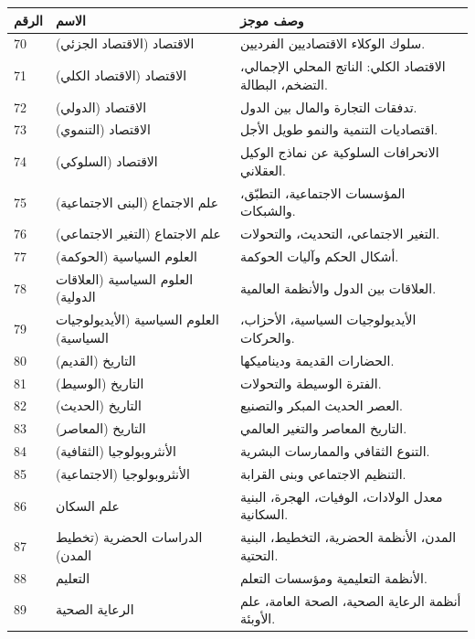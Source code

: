 \documentclass[13pt,a4paper]{article}
\begin{document}
	\begin{longtable}{|p{0.9cm}|p{6.0cm}|p{8.6cm}|}
		\hline
		\textbf{الرقم} & \textbf{الاسم} & \textbf{وصف موجز} \\
		\hline
		\endhead
		70 & الاقتصاد (الاقتصاد الجزئي) & سلوك الوكلاء الاقتصاديين الفرديين. \\
		\hline
		71 & الاقتصاد (الاقتصاد الكلي) & الاقتصاد الكلي: الناتج المحلي الإجمالي، التضخم، البطالة. \\
		\hline
		72 & الاقتصاد (الدولي) & تدفقات التجارة والمال بين الدول. \\
		\hline
		73 & الاقتصاد (التنموي) & اقتصاديات التنمية والنمو طويل الأجل. \\
		\hline
		74 & الاقتصاد (السلوكي) & الانحرافات السلوكية عن نماذج الوكيل العقلاني. \\
		\hline
		75 & علم الاجتماع (البنى الاجتماعية) & المؤسسات الاجتماعية، التطبّق، والشبكات. \\
		\hline
		76 & علم الاجتماع (التغير الاجتماعي) & التغير الاجتماعي، التحديث، والتحولات. \\
		\hline
		77 & العلوم السياسية (الحوكمة) & أشكال الحكم وآليات الحوكمة. \\
		\hline
		78 & العلوم السياسية (العلاقات الدولية) & العلاقات بين الدول والأنظمة العالمية. \\
		\hline
		79 & العلوم السياسية (الأيديولوجيات السياسية) & الأيديولوجيات السياسية، الأحزاب، والحركات. \\
		\hline
		80 & التاريخ (القديم) & الحضارات القديمة وديناميكها. \\
		\hline
		81 & التاريخ (الوسيط) & الفترة الوسيطة والتحولات. \\
		\hline
		82 & التاريخ (الحديث) & العصر الحديث المبكر والتصنيع. \\
		\hline
		83 & التاريخ (المعاصر) & التاريخ المعاصر والتغير العالمي. \\
		\hline
		84 & الأنثروبولوجيا (الثقافية) & التنوع الثقافي والممارسات البشرية. \\
		\hline
		85 & الأنثروبولوجيا (الاجتماعية) & التنظيم الاجتماعي وبنى القرابة. \\
		\hline
		86 & علم السكان & معدل الولادات، الوفيات، الهجرة، البنية السكانية. \\
		\hline
		87 & الدراسات الحضرية (تخطيط المدن) & المدن، الأنظمة الحضرية، التخطيط، البنية التحتية. \\
		\hline
		88 & التعليم & الأنظمة التعليمية ومؤسسات التعلم. \\
		\hline
		89 & الرعاية الصحية & أنظمة الرعاية الصحية، الصحة العامة، علم الأوبئة. \\
		\hline
	\end{longtable}
	
\end{document}
